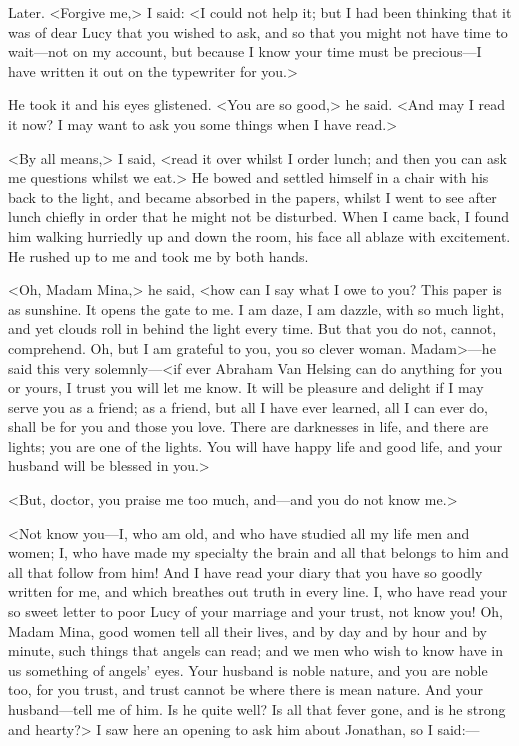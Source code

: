 \begin{diary}{Later.}
<Forgive me,> I said: <I could not help it; but I had been thinking that it was of dear Lucy that you wished to ask, and so that you might not have time to wait—not on my account, but because I know your time must be precious—I have written it out on the typewriter for you.>

He took it and his eyes glistened. <You are so good,> he said. <And may I read it now? I may want to ask you some things when I have read.>

<By all means,> I said, <read it over whilst I order lunch; and then you can ask me questions whilst we eat.> He bowed and settled himself in a chair with his back to the light, and became absorbed in the papers, whilst I went to see after lunch chiefly in order that he might not be disturbed. When I came back, I found him walking hurriedly up and down the room, his face all ablaze with excitement. He rushed up to me and took me by both hands.

<Oh, Madam Mina,> he said, <how can I say what I owe to you? This paper is as sunshine. It opens the gate to me. I am daze, I am dazzle, with so much light, and yet clouds roll in behind the light every time. But that you do not, cannot, comprehend. Oh, but I am grateful to you, you so clever woman. Madam>—he said this very solemnly—<if ever Abraham Van Helsing can do anything for you or yours, I trust you will let me know. It will be pleasure and delight if I may serve you as a friend; as a friend, but all I have ever learned, all I can ever do, shall be for you and those you love. There are darknesses in life, and there are lights; you are one of the lights. You will have happy life and good life, and your husband will be blessed in you.>

<But, doctor, you praise me too much, and—and you do not know me.>

<Not know you—I, who am old, and who have studied all my life men and women; I, who have made my specialty the brain and all that belongs to him and all that follow from him! And I have read your diary that you have so goodly written for me, and which breathes out truth in every line. I, who have read your so sweet letter to poor Lucy of your marriage and your trust, not know you! Oh, Madam Mina, good women tell all their lives, and by day and by hour and by minute, such things that angels can read; and we men who wish to know have in us something of angels' eyes. Your husband is noble nature, and you are noble too, for you trust, and trust cannot be where there is mean nature. And your husband—tell me of him. Is he quite well? Is all that fever gone, and is he strong and hearty?> I saw here an opening to ask him about Jonathan, so I said:—


\end{diary}
